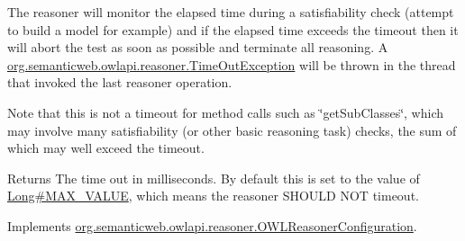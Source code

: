 The reasoner will monitor the elapsed time during a satisfiability check (attempt to build a model for example) and if the elapsed time exceeds the timeout then it will abort the test as soon as possible and terminate all reasoning. A \hyperlink{classorg_1_1semanticweb_1_1owlapi_1_1reasoner_1_1_time_out_exception}{org.\-semanticweb.\-owlapi.\-reasoner.\-Time\-Out\-Exception} will be thrown in the thread that invoked the last reasoner operation. 

Note that this is not a timeout for method calls such as \char`\"{}get\-Sub\-Classes\char`\"{}, which may involve many satisfiability (or other basic reasoning task) checks, the sum of which may well exceed the timeout. \begin{DoxyReturn}{Returns}
The time out in milliseconds. By default this is set to the value of \hyperlink{}{Long\#\-M\-A\-X\-\_\-\-V\-A\-L\-U\-E}, which means the reasoner S\-H\-O\-U\-L\-D N\-O\-T timeout. 
\end{DoxyReturn}


Implements \hyperlink{interfaceorg_1_1semanticweb_1_1owlapi_1_1reasoner_1_1_o_w_l_reasoner_configuration_abe360b719e310b935dd1dcb8fb6b5869}{org.\-semanticweb.\-owlapi.\-reasoner.\-O\-W\-L\-Reasoner\-Configuration}.



